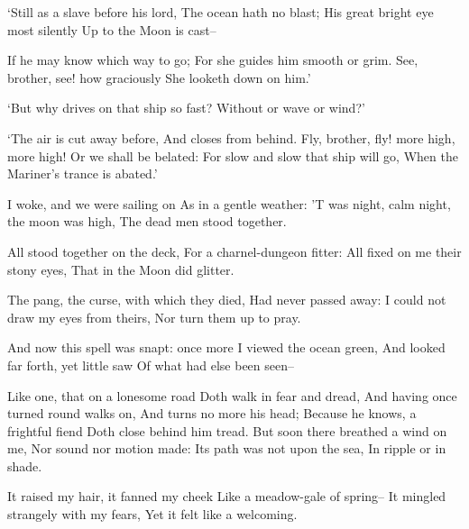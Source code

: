 \documentclass{book}
\newcommand{\strophaVI}{%
  \Forma \strophae {0{\penalty 10000}0000{\penalty 10000}0}}
\begin{document}

  `Still as a slave before his lord,
  The ocean hath no blast; 
  His great bright eye most silently
  Up to the Moon is cast--

  If he may know which way to go;
  For she guides him smooth or grim.
  See, brother, see! how graciously 
  She looketh down on him.'


%
  `But why drives on that ship so fast?
  Without or wave or wind?'


  `The air is cut away before,
  And closes from behind. 
  Fly, brother, fly! more high, more high!
  Or we shall be belated:
  For slow and slow that ship will go,
  When the Mariner's trance is abated.'

%
  I woke, and we were sailing on                                     
  As in a gentle weather:
  'T was night, calm night, the moon was high,
  The dead men stood together.

  All stood together on the deck,
  For a charnel-dungeon fitter:                                      
  All fixed on me their stony eyes,
  That in the Moon did glitter.

  The pang, the curse, with which they died,
  Had never passed away:
  I could not draw my eyes from theirs,                              
  Nor turn them up to pray.

%
  And now this spell was snapt: once more
  I viewed the ocean green,
  And looked far forth, yet little saw
  Of what had else been seen--                                       

{\strophaVI
  Like one, that on a lonesome road
  Doth walk in fear and dread,
  And having once turned round walks on,
  And turns no more his head;
  Because he knows, a frightful fiend                                
  Doth close behind him tread.
}
  But soon there breathed a wind on me,
  Nor sound nor motion made:
  Its path was not upon the sea,
  In ripple or in shade.                                             

  It raised my hair, it fanned my cheek
  Like a meadow-gale of spring--
  It mingled strangely with my fears,
  Yet it felt like a welcoming.
\end{document}
